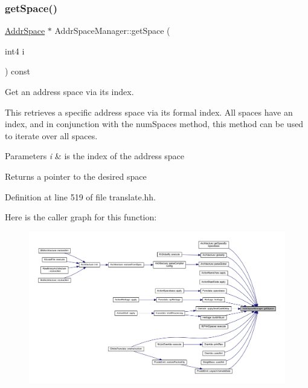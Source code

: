 \subsubsection{\texorpdfstring{getSpace()}{getSpace()}}
{\footnotesize\ttfamily \mbox{\hyperlink{class_addr_space}{Addr\+Space}} $\ast$ Addr\+Space\+Manager\+::get\+Space (\begin{DoxyParamCaption}\item[{int4}]{i }\end{DoxyParamCaption}) const\hspace{0.3cm}{\ttfamily [inline]}}



Get an address space via its index. 

This retrieves a specific address space via its formal index. All spaces have an index, and in conjunction with the num\+Spaces method, this method can be used to iterate over all spaces. 
\begin{DoxyParams}{Parameters}
{\em i} & is the index of the address space \\
\hline
\end{DoxyParams}
\begin{DoxyReturn}{Returns}
a pointer to the desired space 
\end{DoxyReturn}


Definition at line 519 of file translate.\+hh.

Here is the caller graph for this function\+:
\nopagebreak
\begin{figure}[H]
\begin{center}
\leavevmode
\includegraphics[width=350pt]{class_addr_space_manager_ad1a9a620e767ffe8bd929913f882e2a4_icgraph}
\end{center}
\end{figure}
\mbox{\label{class_addr_space_manager_a24efffb904ebb1a0a541fa74cafd51fc}} 
